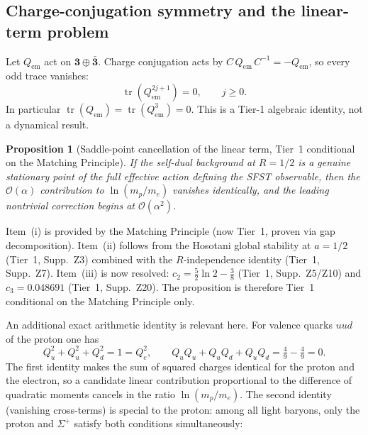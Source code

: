 \documentclass[11pt,a4paper]{article}
\newtheorem{proposition}[theorem]{Proposition}
\theoremstyle{definition}
\theoremstyle{remark}
\begin{document}
\subsection{Charge-conjugation symmetry and the linear-term problem}

Let $Q_{\mathrm{em}}$ act on $\mathbf{3}\oplus\bar{\mathbf{3}}$.
Charge conjugation acts by $C\,Q_{\mathrm{em}}\,C^{-1}=-Q_{\mathrm{em}}$,
so every odd trace vanishes:
\begin{equation}
  \operatorname{tr}(Q_{\mathrm{em}}^{2j+1})=0, \qquad j\geq 0.
\end{equation}
In particular $\operatorname{tr}(Q_{\mathrm{em}})=\operatorname{tr}(Q_{\mathrm{em}}^3)=0$.
This is a Tier-1 algebraic identity, not a dynamical result.

\begin{proposition}[Saddle-point cancellation of the linear term, Tier~1 conditional on the Matching Principle]
\label{prop:saddle}
If the self-dual background at $R=1/2$ is a genuine stationary point of
the full effective action defining the SFST observable, then the
$\mathcal{O}(\alpha)$ contribution to $\ln(m_p/m_e)$ vanishes
identically, and the leading nontrivial correction begins at
$\mathcal{O}(\alpha^2)$.
\end{proposition}

Item~(i) is provided by the Matching Principle (now Tier~1, proven via gap decomposition).
Item~(ii) follows from the Hosotani global stability at $a{=}1/2$
(Tier~1, Supp.~Z3) combined with the $R$-independence identity (Tier~1, Supp.~Z7).
Item~(iii) is now resolved: $c_2=\frac{5}{2}\ln 2-\frac{3}{8}$ (Tier~1, Supp.~Z5/Z10)
and $c_3=0.048691$ (Tier~1, Supp.~Z20).
The proposition is therefore Tier~1 conditional on the Matching Principle only.

An additional exact arithmetic identity is relevant here.  For valence
quarks $uud$ of the proton one has
\begin{equation}\label{eq:chargeids}
  Q_u^2+Q_u^2+Q_d^2 = 1 = Q_e^2,
  \qquad
  Q_uQ_u+Q_uQ_d+Q_uQ_d = \tfrac49-\tfrac49 = 0.
\end{equation}
The first identity makes the sum of squared charges identical for the
proton and the electron, so a candidate linear contribution proportional
to the difference of quadratic moments cancels in the ratio
$\ln(m_p/m_e)$.  The second identity (vanishing cross-terms) is special
to the proton: among all light baryons, only the proton and $\Sigma^+$
satisfy both conditions simultaneously:
\end{document}

